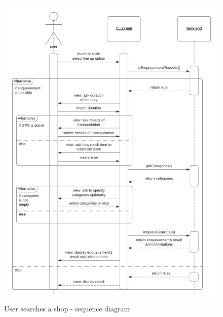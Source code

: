 \begin{figure}[h!]
    \centering
    \includegraphics[width=\textwidth]{Images/sequencediagrams/UserlinesupSD.png}
    \caption{\label{fig:userlinesup}User searches a shop - sequence diagram}
\end{figure}

